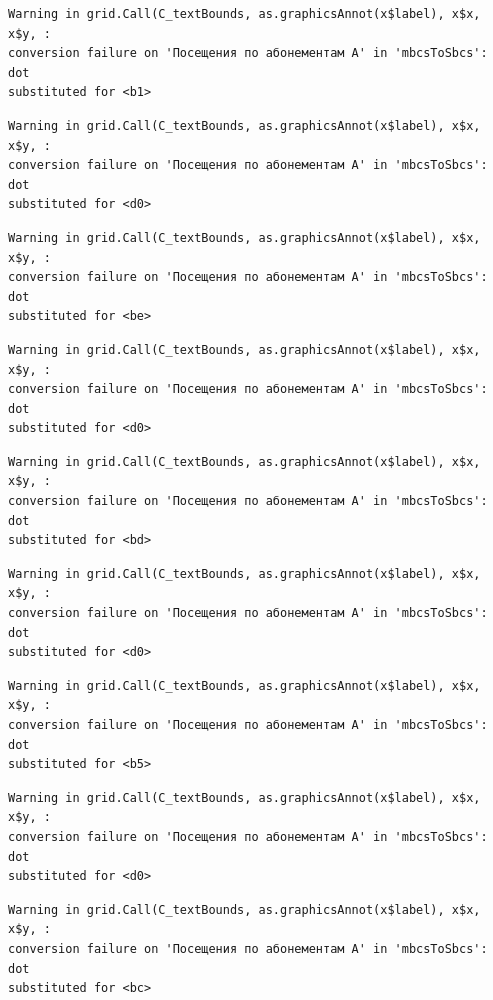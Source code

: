 \documentclass[
  letterpaper,
  DIV=11,
  numbers=noendperiod]{scrartcl}
\begin{document}
\begin{verbatim}
Warning in grid.Call(C_textBounds, as.graphicsAnnot(x$label), x$x, x$y, :
conversion failure on 'Посещения по абонементам А' in 'mbcsToSbcs': dot
substituted for <b1>
\end{verbatim}

\begin{verbatim}
Warning in grid.Call(C_textBounds, as.graphicsAnnot(x$label), x$x, x$y, :
conversion failure on 'Посещения по абонементам А' in 'mbcsToSbcs': dot
substituted for <d0>
\end{verbatim}

\begin{verbatim}
Warning in grid.Call(C_textBounds, as.graphicsAnnot(x$label), x$x, x$y, :
conversion failure on 'Посещения по абонементам А' in 'mbcsToSbcs': dot
substituted for <be>
\end{verbatim}

\begin{verbatim}
Warning in grid.Call(C_textBounds, as.graphicsAnnot(x$label), x$x, x$y, :
conversion failure on 'Посещения по абонементам А' in 'mbcsToSbcs': dot
substituted for <d0>
\end{verbatim}

\begin{verbatim}
Warning in grid.Call(C_textBounds, as.graphicsAnnot(x$label), x$x, x$y, :
conversion failure on 'Посещения по абонементам А' in 'mbcsToSbcs': dot
substituted for <bd>
\end{verbatim}

\begin{verbatim}
Warning in grid.Call(C_textBounds, as.graphicsAnnot(x$label), x$x, x$y, :
conversion failure on 'Посещения по абонементам А' in 'mbcsToSbcs': dot
substituted for <d0>
\end{verbatim}

\begin{verbatim}
Warning in grid.Call(C_textBounds, as.graphicsAnnot(x$label), x$x, x$y, :
conversion failure on 'Посещения по абонементам А' in 'mbcsToSbcs': dot
substituted for <b5>
\end{verbatim}

\begin{verbatim}
Warning in grid.Call(C_textBounds, as.graphicsAnnot(x$label), x$x, x$y, :
conversion failure on 'Посещения по абонементам А' in 'mbcsToSbcs': dot
substituted for <d0>
\end{verbatim}

\begin{verbatim}
Warning in grid.Call(C_textBounds, as.graphicsAnnot(x$label), x$x, x$y, :
conversion failure on 'Посещения по абонементам А' in 'mbcsToSbcs': dot
substituted for <bc>
\end{verbatim}
\end{document}
